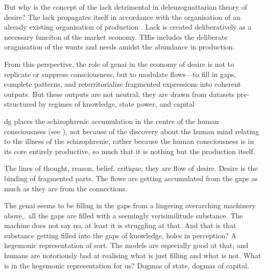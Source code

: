But why is the concept of the lack detrimental in deleuzoguattarian theory of
desire? The lack propagates itself in accordance with the organisation of an
already existing organisation of production \parencite[28]{deleuze1983} . Lack
is created deliberatively as a necessary funciton of the market economy. THis
includes the deliberate oragnisation of the wants and needs amidst the
abundance in production.






\begin{orangebox}
	From this perspective, the role of \gls{genai} in the economy of desire is not to replicate or suppress consciousness, but to modulate flows—to fill in gaps, complete patterns, and reterritorialize fragmented expressions into coherent outputs. But these outputs are not neutral; they are drawn from datasets pre-structured by regimes of knowledge, state power, and capital \parencite[251–254]{deleuze1983}
\end{orangebox}

\Gls{dg} places the schizophrenic accumulation in the centre of the human
consciousness (see \cite[]{deleuze1983}), not because of the discovery about
the human mind relating to the illness of the schizophrenie, rather because the
human consciousness is in its core entirely productive, so much that it is
nothing but the production itself.


\begin{redbox}


	The lines of thought, reason, belief, critique; they are flow of desire. Desire
	is the binding of fragmented parts. The flows are getting accumulated from the
	gaps as much as they are from the connections.

	The \gls{genai} seems to be filling in the gaps from a lingering overarching
	machinery above,. all the gaps are filled with a seemingly verisimilitude
	substance. The machine does not say no, at least it is struggling at that. And
	that is that substance getting filled into the gaps of knowledge, holes in
	perception? A hegemonic representation of sort. The models are especially good
	at that, and humans are notoriously bad at realising what is just filling and
	what is not. What is in the hegemonic representation for us? Dogmas of state,
	dogmas of capital.

\end{redbox}

